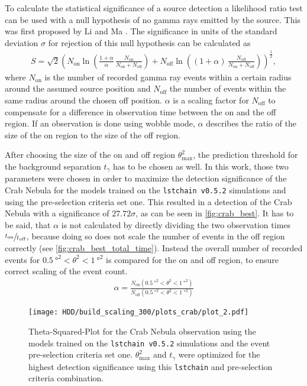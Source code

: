 To calculate the statistical significance of a source detection a likelihood ratio test can be used with a null hypothesis of no gamma rays emitted by the source.
This was first proposed by Li and Ma \cite{Li_Ma}.
The significance in units of the standard deviation $\sigma$ for rejection of this null hypothesis can be calculated as
\begin{align}
    S = \sqrt{2} \left( 
        N_\text{on} \ln\left( \frac{1 + \alpha}{\alpha}\, \frac{N_\text{on}}{N_\text{on} + N_\text{off}} \right) + 
        N_\text{off} \ln\left( (1 + \alpha)\, \frac{N_\text{off}}{N_\text{on} + N_\text{off}} \right) 
    \right)^{\frac{1}{2}},
\end{align}
where $N_\text{on}$ is the number of recorded gamma ray events within a certain radius around the assumed source position and $N_\text{off}$ the number of events within 
the same radius around the chosen off position. 
$\alpha$ is a scaling factor for $N_\text{off}$ to compensate for a difference in observation time between the on and the off region.
If an observation is done using wobble mode, $\alpha$ describes the ratio of the size of the on region to the size of the off region.

After choosing the size of the on and off region $\theta_\text{max}^2$, the prediction threshold for the background separation $t_\gamma$ has to be chosen as well.
In this work, those two parameters were chosen in order to maximize the detection significance of the Crab Nebula for the models trained on the 
\texttt{lstchain v0.5.2} simulations and using the pre-selection criteria set one.
This resulted in a detection of the Crab Nebula with a significance of $\num{27.72} \sigma$, as can be seen in \autoref{fig:crab_best}.
It has to be said, that $\alpha$ is not calculated by directly dividing the two observation times $\sfrac{t_\text{on}}{t_\text{off}}$, because doing so 
does not scale the number of events in the off region correctly (see \autoref{fig:crab_best_total_time}).
Instead the overall number of recorded events for $\SI{0.5}{\degree\squared} < \theta^2 < \SI{1}{\degree\squared}$ is compared for the on and off region,
to ensure correct scaling of the event count.
\begin{align}
    \alpha = \frac{N_\text{on}(\SI{0.5}{\degree\squared} < \theta^2 < \SI{1}{\degree\squared})}{N_\text{off}(\SI{0.5}{\degree\squared} < \theta^2 < \SI{1}{\degree\squared})}
\end{align}
\begin{figure}
    \centering
    \texttt{[image: HDD/build\_scaling\_300/plots\_crab/plot\_2.pdf]}
    \caption{Theta-Squared-Plot for the Crab Nebula observation using the models trained on the \texttt{lstchain v0.5.2} simulations and the event pre-selection criteria set one.
        $\theta_\text{max}^2$ and $t_\gamma$ were optimized for the highest detection significance using this \texttt{lstchain} and pre-selection criteria combination.
    }
    \label{fig:crab_best}
\end{figure}

